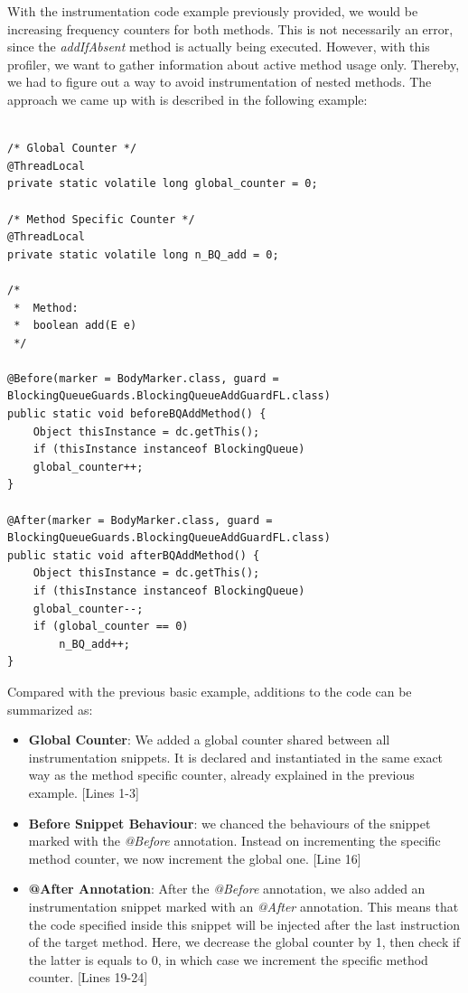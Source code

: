 \documentclass[]{usiinfthesis}
\begin{document}
\noindent
With the instrumentation code example previously provided, we would be increasing frequency counters for both methods. This is not necessarily an error, since the \textit{addIfAbsent} method is actually being executed. However, with this profiler, we want to gather information about active method usage only.  Thereby, we had to figure out a way to avoid instrumentation of nested methods. The approach we came up with is described in the following example:



\vspace*{0.5cm}
\begin{verbatim}

/* Global Counter */
@ThreadLocal
private static volatile long global_counter = 0;

/* Method Specific Counter */
@ThreadLocal
private static volatile long n_BQ_add = 0;

/*
 *  Method:
 *  boolean add(E e)
 */

@Before(marker = BodyMarker.class, guard = BlockingQueueGuards.BlockingQueueAddGuardFL.class)
public static void beforeBQAddMethod() {
    Object thisInstance = dc.getThis();
    if (thisInstance instanceof BlockingQueue)
    global_counter++;
}

@After(marker = BodyMarker.class, guard = BlockingQueueGuards.BlockingQueueAddGuardFL.class)
public static void afterBQAddMethod() {
    Object thisInstance = dc.getThis();
    if (thisInstance instanceof BlockingQueue)
    global_counter--;
    if (global_counter == 0)
        n_BQ_add++;
}
\end{verbatim}
\vspace*{0.5cm}

Compared with the previous basic example, additions to the code can be summarized as:
\begin{itemize}
    \item \textbf{Global Counter}: We added a global counter shared between all instrumentation snippets. It is declared and instantiated in the same exact way as the method specific counter, already explained in the previous example. [Lines 1-3]
    \item \textbf{Before Snippet Behaviour}: we chanced the behaviours of the snippet marked with the \textit{@Before} annotation. Instead on incrementing the specific method counter, we now increment the global one. [Line 16]
    \item \textbf{@After Annotation}: After the \textit{@Before} annotation, we also added an instrumentation snippet marked with an \textit{@After} annotation. This means that the code specified inside this snippet will be injected after the last instruction of the target method. Here, we decrease the global counter by 1, then check if the latter is equals to 0, in which case we increment the specific method counter. [Lines 19-24]
\end{itemize}
\end{document}
